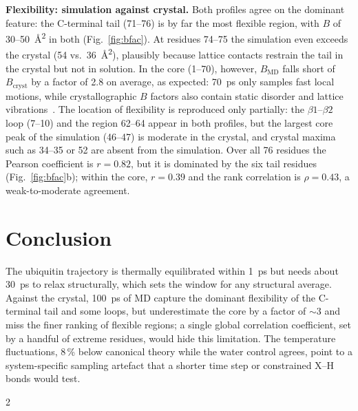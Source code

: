 \documentclass[10pt,a4paper]{article}
\begin{document}
\textbf{Flexibility: simulation against crystal.} Both profiles agree on the dominant feature: the C-terminal tail (71--76) is by far the most flexible region, with $B$ of 30--\SI{50}{\angstrom^2} in both (Fig.~\ref{fig:bfac}). At residues 74--75 the simulation even exceeds the crystal (54 vs.\ \SI{36}{\angstrom^2}), plausibly because lattice contacts restrain the tail in the crystal but not in solution. In the core (1--70), however, $B_\mathrm{MD}$ falls short of $B_\mathrm{cryst}$ by a factor of 2.8 on average, as expected: \SI{70}{ps} only samples fast local motions, while crystallographic $B$ factors also contain static disorder and lattice vibrations~\cite{hunenberger}. The location of flexibility is reproduced only partially: the $\beta1$--$\beta2$ loop (7--10) and the region 62--64 appear in both profiles, but the largest core peak of the simulation (46--47) is moderate in the crystal, and crystal maxima such as 34--35 or 52 are absent from the simulation. Over all 76 residues the Pearson coefficient is $r = 0.82$, but it is dominated by the six tail residues (Fig.~\ref{fig:bfac}b); within the core, $r = 0.39$ and the rank correlation is $\rho = 0.43$, a weak-to-moderate agreement.

\section{Conclusion}
The ubiquitin trajectory is thermally equilibrated within \SI{1}{ps} but needs about \SI{30}{ps} to relax structurally, which sets the window for any structural average. Against the crystal, \SI{100}{ps} of MD capture the dominant flexibility of the C-terminal tail and some loops, but underestimate the core by a factor of $\sim$3 and miss the finer ranking of flexible regions; a single global correlation coefficient, set by a handful of extreme residues, would hide this limitation. The temperature fluctuations, 8\,\% below canonical theory while the water control agrees, point to a system-specific sampling artefact that a shorter time step or constrained X--H bonds would test.
{\footnotesize
\begin{multicols}{2}


\end{multicols}
}
\end{document}
